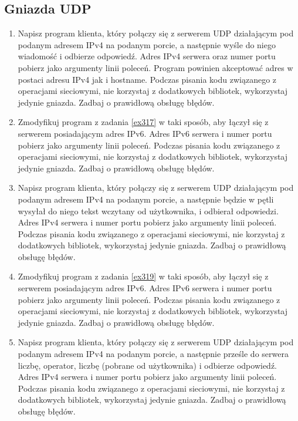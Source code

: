 \documentclass{article}
\begin{document}
\subsection*{Gniazda UDP}

\begin{enumerate}[label=\textbf{3.\arabic*}, resume]\setlength{\itemsep}{1em}

\item \label{ex317}  Napisz program klienta, który połączy się z serwerem UDP działającym pod podanym adresem IPv4 na podanym porcie, a następnie wyśle do niego wiadomość i odbierze odpowiedź. Adres IPv4 serwera oraz numer portu pobierz jako argumenty linii poleceń. Program powinien akceptować adres w postaci adresu IPv4 jak i hostname.  Podczas pisania kodu związanego z operacjami sieciowymi, nie korzystaj z dodatkowych bibliotek, wykorzystaj jedynie gniazda. Zadbaj o prawidłową obsługę błędów.  

\item  Zmodyfikuj program z zadania \ref{ex317} w taki sposób,  aby łączył się z serwerem posiadającym adres IPv6.  Adres IPv6 serwera i numer portu pobierz jako argumenty linii poleceń. Podczas pisania kodu związanego z operacjami sieciowymi, nie korzystaj z dodatkowych bibliotek, wykorzystaj jedynie gniazda. Zadbaj o prawidłową obsługę błędów. 

\item \label{ex319} Napisz program klienta, który połączy się z serwerem UDP działającym pod podanym adresem IPv4 na podanym porcie,  a następnie będzie w pętli wysyłał do niego tekst wczytany od użytkownika, i odbierał odpowiedzi.    Adres IPv4 serwera i numer portu pobierz jako argumenty linii poleceń. Podczas pisania kodu związanego z operacjami sieciowymi, nie korzystaj z dodatkowych bibliotek, wykorzystaj jedynie gniazda. Zadbaj o prawidłową obsługę błędów. 

\item  Zmodyfikuj program z zadania \ref{ex319} w taki sposób,  aby łączył się z serwerem posiadającym adres IPv6. Adres IPv6 serwera i numer portu pobierz jako argumenty linii poleceń. Podczas pisania kodu związanego z operacjami sieciowymi, nie korzystaj z dodatkowych bibliotek, wykorzystaj jedynie gniazda. Zadbaj o prawidłową obsługę błędów. 

\item \label{ex321} Napisz program klienta, który połączy się z serwerem UDP działającym pod podanym adresem IPv4 na podanym porcie, a następnie prześle do serwera liczbę, operator, liczbę (pobrane od użytkownika) i odbierze odpowiedź. Adres IPv4 serwera i numer portu pobierz jako argumenty linii poleceń.  Podczas pisania kodu związanego z operacjami sieciowymi, nie korzystaj z dodatkowych bibliotek, wykorzystaj jedynie gniazda. Zadbaj o prawidłową obsługę błędów. 


\end{enumerate}
\end{document}
